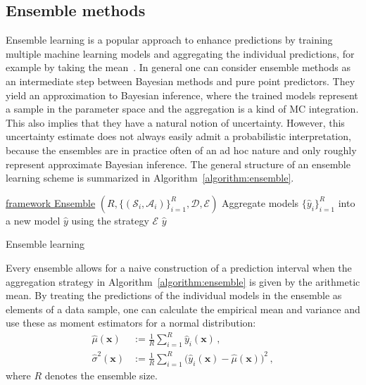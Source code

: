 \documentclass[smallcondensed]{svjour3}
\let\oldnl\nl%
\newcommand{\nonl}{\renewcommand{\nl}{\let\nl\oldnl}}%
\begin{document}
\subsection{Ensemble methods}\label{section:ensembles}

    Ensemble learning is a popular approach to enhance predictions by training multiple machine learning models and aggregating the individual predictions, for example by taking the mean~\cite{krogh1996learning}. In general one can consider ensemble methods as an intermediate step between Bayesian methods
    and pure point predictors. They yield an approximation to Bayesian inference, where the trained models represent a sample in the parameter space and the aggregation is a kind of MC integration. This also implies that they have a natural notion of uncertainty. However, this uncertainty estimate does not always easily admit a probabilistic interpretation, because the ensembles are in practice often of an ad hoc nature and only roughly represent approximate Bayesian inference. The general structure of an ensemble learning scheme is summarized in Algorithm~\ref{algorithm:ensemble}.

    \begin{algorithm}[t!]

        \nonl\underline{framework Ensemble} $(R, \{(\mathcal{S}_i,\mathcal{A}_i)\}_{i=1}^R,\mathcal{D},\mathcal{E})$\;
        Aggregate models $\{\hat{y}_i\}_{i=1}^R$ into a new model $\hat{y}$ using the strategy $\mathcal{E}$\;
        \KwRet $\hat{y}$
        \caption{Ensemble learning}
        \label{algorithm:ensemble}
    \end{algorithm}

    Every ensemble allows for a naive construction of a prediction interval \cite{heskes1997practical} when the aggregation strategy in Algorithm~\ref{algorithm:ensemble} is given by the arithmetic mean. By treating the predictions of the individual models in the ensemble as elements of a data sample, one can calculate the empirical mean and variance and use these as moment estimators for a normal distribution:
    \begin{align}
        \hat{\mu}(\mathbf{x}) &:= \frac{1}{R}\sum_{i=1}^R\hat{y}_i(\mathbf{x})\,,\\
        \hat{\sigma}^2(\mathbf{x}) &:= \frac{1}{R}\sum_{i=1}^R\big(\hat{y}_i(\mathbf{x})-\hat{\mu}(\mathbf{x})\big)^2\,,
    \end{align}
    where $R$ denotes the ensemble size.
\end{document}
